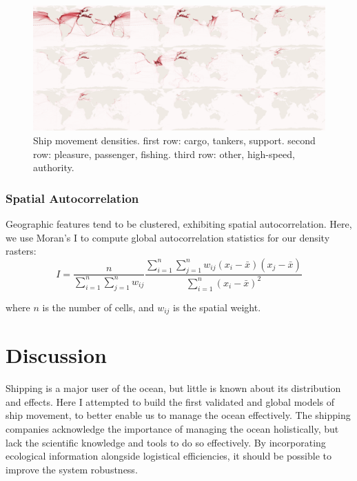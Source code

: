 \documentclass[12pt,letterpaper]{article}
\begin{document}
\begin{figure}[htbp]
  \centerline{\includegraphics[width=220mm]{figures/9fold-map-black-test_cropped_inverted_thesis.png}}
  \caption{Ship movement densities. first row: cargo, tankers, support. second row:  pleasure, passenger, fishing. third row: other, high-speed, authority.}
  \label{fig:9fold-ship-maps}
\end{figure}


\subsubsection{Spatial Autocorrelation}

Geographic features tend to be clustered, exhibiting spatial autocorrelation. Here, we use Moran's I to compute global autocorrelation statistics for our density rasters:
\begin{equation}
I = \frac{n}{\sum_{i=1}^{n}\sum_{j=1}^{n}w_{ij}}
\frac{\sum_{i=1}^{n}\sum_{j=1}^{n}w_{ij}(x_i-\bar{x})(x_j-\bar{x})}{\sum_{i=1}^{n}(x_i - \bar{x})^2}
\end{equation}

where $n$ is the number of cells, and $w_{ij}$ is the spatial weight.


\section{\textbf{Discussion}}


Shipping is a major user of the ocean, but little is known about its distribution and effects. Here I attempted to build the first validated and global models of ship movement, to better enable us to manage the ocean effectively. The shipping companies acknowledge the importance of managing the ocean holistically, but lack the scientific knowledge and tools to do so effectively. By incorporating ecological information alongside logistical efficiencies, it should be possible to improve the system robustness.
\end{document}
